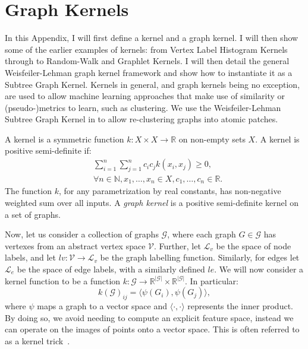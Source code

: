 \chapter{Graph Kernels}
\label{appendix:graph_kernels}

In this Appendix, I will first define a kernel and a graph kernel. I will then
show some of the earlier examples of kernels: from Vertex Label Histogram
Kernels through to Random-Walk and Graphlet Kernels. I will then detail the
general Weisfeiler-Lehman graph kernel framework and show how to instantiate it
as a Subtree Graph Kernel. Kernels in general, and graph kernels being no
exception, are used to allow machine learning approaches that make use of
similarity or (pseudo-)metrics to learn, such as clustering. We use the
Weisfeiler-Lehman Subtree Graph Kernel in  to allow
re-clustering \deltaPDGN graphs into atomic patches.

A kernel is a symmetric function $k: X \times X \rightarrow \mathbb{R}$ on
non-empty sets $X$. A kernel is positive semi-definite if:
\begin{align*}
	&\sum_{i=1}^{n} \sum_{j=1}^{n} c_i c_j k(x_i, x_j) \geq 0, \\
	&\forall n \in \mathbb{N}, x_1, \ldots, x_n \in X, c_1, \ldots, c_n \in \mathbb{R}. 
\end{align*}
The function $k$, for any
parametrization by real constants, has non-negative weighted sum over all
inputs. A \emph{graph kernel} is a positive semi-definite kernel on a set of graphs.

Now, let us consider a collection of graphs $\mathcal{G}$, where each graph $G
\in \mathcal{G}$ has vertexes from an abstract vertex space $\mathcal{V}$.
Further, let $\mathcal{L}_v$ be the space of node labels, and let $lv:
\mathcal{V} \rightarrow \mathcal{L}_v$ be the graph labelling function.
Similarly, for edges let $\mathcal{L}_e$ be the space of edge labels, with a
similarly defined $le$. We will now consider a kernel function to be a function
$k: \mathcal{G} \rightarrow \mathbb{R}^{|\mathcal{G}|} \times
\mathbb{R}^{|\mathcal{G}|}$. In particular:
\begin{equation}
\label{eq:kernel_general}
    k(\mathcal{G})_{ij} = \langle\psi(G_i), \psi(G_j)\rangle,
\end{equation}
%
where $\psi$ maps a graph to a vector space and $\langle\cdot,\cdot\rangle$
represents the inner product. By doing so, we avoid needing to compute an
explicit feature space, instead we can operate on the images of points onto a
vector space. This is often referred to as a kernel
trick~\cite{theodoridis2008}.


